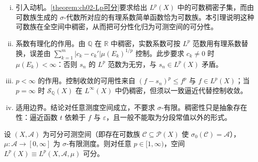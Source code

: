 \documentclass[../../main.tex]{subfiles}%
\begin{document}
\begin{remark}\label{remark:ch02-有理简单函数稠密}
\begin{enumerate}[(i)]
\item 引入动机。\cref{theorem:ch02-Lp可分}要求给出 $L^p(X)$ 中的可数稠密子集，而由可数族生成的 $\sigma$-代数所对应的有理系数简单函数恰为可数族。本引理说明这种可数族在全空间中稠密，从而把可分性化归为可测空间的可分性。
\item 系数有理化的作用。由 $\mathbb Q$ 在 $\mathbb R$ 中稠密，实数系数可按 $L^p$ 范数用有理系数替换，误差由 $\sum_{k=1}^m|c_k-c_k'|\mu(E_k)^{1/p}$ 控制。此步要求 $c_k\neq0$ 时 $\mu(E_k)<\infty$：否则 $s_n$ 的 $L^p$ 范数为无穷，与 $s_n\in L^p(X)$ 矛盾。
\item $p<\infty$ 的作用。控制收敛的可用性来自 $(f-s_n)^p\leqslant f^p$ 与 $f\in L^p(X)$；当 $p=\infty$ 时 $\mathscr S_{\mathbb Q}(X)$ 在 $L^\infty(X)$ 中仍稠密，但须以一致逼近代替控制收敛。
\item 适用边界。结论对任意测度空间成立，不要求 $\sigma$-有限。稠密性只是抽象存在性：逼近函数 $t$ 依赖于 $f$ 与 $\varepsilon$，且一般不能取为分段常值以外的形式。
\end{enumerate}
\end{remark}

\begin{theorem}\label{theorem:ch02-Lp可分}
设 $(X,\mathscr A)$ 为可分可测空间（即存在可数族 $\mathscr C\subseteq\mathscr P(X)$ 使 $\sigma_0(\mathscr C)=\mathscr A$），$\mu:\mathscr A\to[0,\infty]$ 为 $\sigma$-有限测度。则对任意 $p\in[1,\infty)$，空间 $L^p(X)\equiv L^p(X,\mathscr A,\mu)$ 可分。
\end{theorem}
\end{document}
